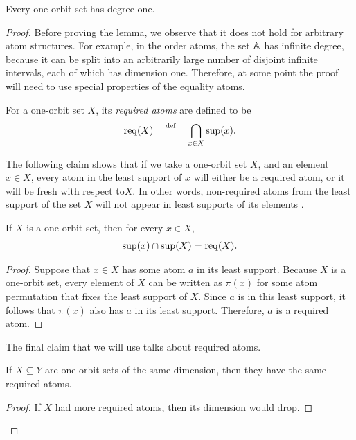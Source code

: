 \begin{lemma}\label{lem:one-orbit-one-degree}
    Every one-orbit set has degree one. 
\end{lemma}
\begin{proof}
Before proving the lemma, we observe that it does not hold for arbitrary atom structures. For example, in the order atoms, the set $\mathbb A$ has infinite degree, because it can be split into an arbitrarily large number of disjoint infinite intervals, each of which has dimension one.
Therefore, at some point the proof will need to use special properties of the equality atoms. 

\begin{definition}
	For a one-orbit set $X$, its \emph{required atoms} are defined to be
	\begin{align*}
		\operatorname{req}(X)
		\quad \stackrel{\text{def}}= \quad
		\bigcap_{x \in X} \sup(x).
	\end{align*}
\end{definition}

The following claim shows that if we take a one-orbit set $X$, and an element $x \in X$, every atom in the least support of $x$ will either be a required atom, or it will be fresh with respect to$ X$. In other words, non-required atoms from the least support of the set $X$ will not appear in least supports of its elements .
\begin{claim}\label{claim:one-orbit-required}
	If $X$ is a one-orbit set, then for every $x \in X$,
	\begin{align*}
		\sup(x) \cap \sup(X) = \operatorname{req}(X).
	\end{align*}
\end{claim}
\begin{proof}
	Suppose that $x \in X$ has some atom $a$ in its least support. Because $X$ is a one-orbit set, every element of $X$ can be written as  $\pi(x)$ for some atom permutation that fixes the least support of $X$. Since $a$ is in this least support, it follows that $\pi(x)$ also has $a$ in its least support. Therefore, $a$ is a required atom.
\end{proof}

The final claim that we will use talks about required atoms.

\begin{claim}\label{claim:one-orbit-required-same-dimension}
    If $X \subseteq Y$ are one-orbit sets of the same dimension, then they have the same required atoms. 
\end{claim}
\begin{proof}
    If $X$ had more required atoms, then its dimension would drop.
\end{proof}


\end{proof}
